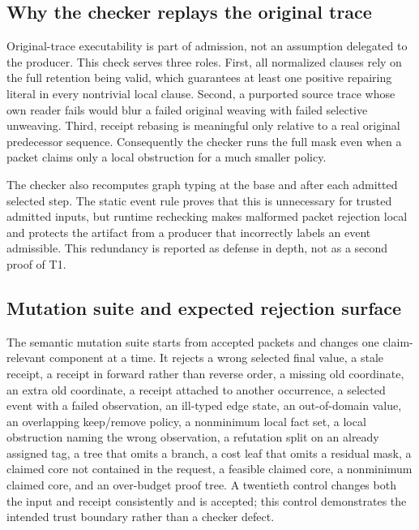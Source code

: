 \subsection{Why the checker replays the original trace}

Original-trace executability is part of admission, not an assumption delegated to the
producer.  This check serves three roles.  First, all normalized clauses rely on the
full retention being valid, which guarantees at least one positive repairing literal
in every nontrivial local clause.  Second, a purported source trace whose own reader
fails would blur a failed original weaving with failed selective unweaving.  Third,
receipt rebasing is meaningful only relative to a real original predecessor sequence.
Consequently the checker runs the full mask even when a packet claims only a local
obstruction for a much smaller policy.

The checker also recomputes graph typing at the base and after each admitted selected
step.  The static event rule proves that this is unnecessary for trusted admitted
inputs, but runtime rechecking makes malformed packet rejection local and protects the
artifact from a producer that incorrectly labels an event admissible.  This redundancy
is reported as defense in depth, not as a second proof of T1.

\subsection{Mutation suite and expected rejection surface}

The semantic mutation suite starts from accepted packets and changes one
claim-relevant component at a time.  It rejects a wrong selected final value, a stale
receipt, a receipt in forward rather than reverse order, a missing old coordinate, an
extra old coordinate, a receipt attached to another occurrence, a selected event with
a failed observation, an ill-typed edge state, an out-of-domain value, an overlapping
keep/remove policy, a nonminimum local fact set, a local obstruction naming the wrong
observation, a refutation split on an already assigned tag, a tree that omits a branch,
a cost leaf that omits a residual mask, a claimed core not contained in the request,
a feasible claimed core, a nonminimum claimed core, and an over-budget proof tree.
A twentieth control changes both the input and receipt consistently and is accepted;
this control demonstrates the intended trust boundary rather than a checker defect.

